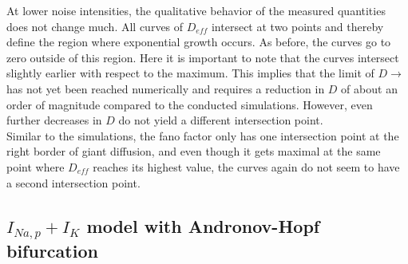 \documentclass[12pt,a4paper]{article}
\begin{document}
At lower noise intensities, the qualitative behavior of the measured quantities does not change much. All curves of $D_{eff}$ intersect at two points and thereby define the region where exponential growth occurs. As before, the curves go to zero outside of this region. Here it is important to note that the curves intersect slightly earlier with respect to the maximum. This implies that the limit of $D\rightarrow$ has not yet been reached numerically and requires a reduction in $D$ of about an order of magnitude compared to the conducted simulations. However, even further decreases in $D$ do not yield a different intersection point. \\
Similar to the simulations, the fano factor only has one intersection point at the right border of giant diffusion, and even though it gets maximal at the same point where $D_{eff}$ reaches its highest value, the curves again do not seem to have a second intersection point.
\subsection{$I_{Na,p}+I_K$ model with Andronov-Hopf bifurcation}
\end{document}
